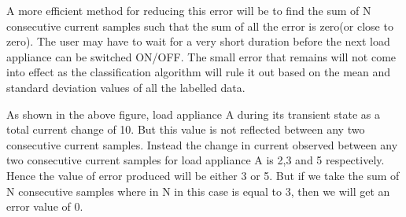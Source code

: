 {A more efficient method for reducing this error will be to find the sum of N consecutive current samples such that the sum of all the error is zero(or close to zero). The user may have to wait for a very short duration before the next load appliance can be switched ON/OFF. The small error that remains will not come into effect as the classification algorithm will rule it out based on the mean and standard deviation values of all the labelled data.

As shown in the above figure, load appliance A during its transient state as a total current change of 10. But this value is not reflected between any two consecutive current samples. Instead the change in current observed between any two consecutive current samples for load appliance A is 2,3 and 5 respectively. Hence the value of error produced will be either 3 or 5. But if we take the sum of N consecutive samples where in N in this case is equal to 3, then we will get an error value of 0.
}

